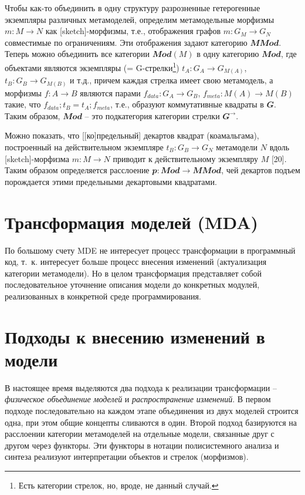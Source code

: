 \documentclass[11pt,draft]{ltxdoc}
\begin{document}
Чтобы как-то объединить в одну структуру разрозненные гетерогенные экземпляры различных метамоделей, определим метамодельные морфизмы $m: M\to N$ как [sketch]-морфизмы,
т.е., отображения графов $m: G_M\to G_N$ совместимые по ограничениям.  Эти
отображения задают категорию $\mathbfit{MMod}$.  Теперь можно объединить все
категории $\mathbfit{Mod}(M)$ в одну категорию $\mathbfit{Mod}$, где объектами
являются экземпляры (= G-стрелки\footnote{Есть категории стрелок, но, вроде, не
  данный случай.}) $t_A: G_A\to G_{M(A)}$,
$t_B: G_B\to G_{M(B)}$ и т.д., причем каждая стрелка имеет свою метамодель, а
морфизмы $f:A\to B$ являются парами $f_{data}: G_A\to G_B$,
$f_{meta}: M(A) \to M(B)$ такие, что $f_{data};t_B = t_A; f_{meta}$, т.е.,
образуют коммутативные квадраты в $\mathbfit{G}$.  Таким образом, $\mathbfit{Mod}$
-- это подкатегория категории стрелки $\mathbfit{G}^{\to}$.

Можно показать, что [[ко]предельный] декартов квадрат (коамальгама), построенный
на действительном экземпляре $t_B: G_B\to G_N$ метамодели $N$ вдоль
[sketch]-морфизма $m:M\to N$ приводит к действительному экземпляру $M$ [20].
Таким образом определяется расслоение $\mathbfit{p} : \mathbfit{Mod} \to
\mathbfit{MMod}$, чей декартов подъем порождается этими предельными декартовыми квадратами.

\section{Трансформация моделей (MDA)}
\label{sec:mda-transform}

По большому счету MDE не интересует процесс трансформации в программный код, т.~к. интересует больше процесс внесения изменений (актуализация категории метамодели). Но в целом трансформация представляет собой последовательное уточнение описания модели до конкретных модулей, реализованных в конкретной среде программирования.

\section{Подходы к внесению изменений в модели}
\label{sec:mde-conversions}

В настоящее время выделяются два подхода к реализации трансформации --
\emph{физическое объединение моделей} и \emph{распространение изменений}.  В
первом подходе последовательно
на каждом этапе объединения из двух моделей строится одна, при этом общие
концепты сливаются в один.  Второй подход базируются на расслоении категории
метамоделей на отдельные модели, связанные друг с другом через функторы.  Эти
функторы в нотации полисистемного анализа и синтеза реализуют интерпретации
объектов и стрелок (морфизмов).
\end{document}
